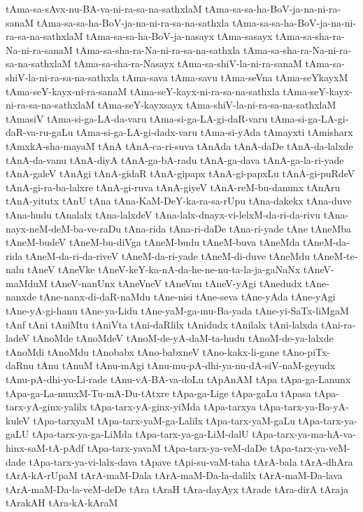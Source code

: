 {tAma-sa-sAvx-nu-BA-va-ni-ra-sa-na-sathxlaM
tAma-sa-sa-ha-BoV-ja-na-ni-ra-sanaM
tAma-sa-sa-ha-BoV-ja-na-ni-ra-sa-na-sathxla
tAma-sa-sa-ha-BoV-ja-na-ni-ra-sa-na-sathxlaM
tAma-sa-sa-ha-BoV-ja-nasayx
tAma-sasayx
tAma-sa-sha-ra-Na-ni-ra-sanaM
tAma-sa-sha-ra-Na-ni-ra-sa-na-sathxla
tAma-sa-sha-ra-Na-ni-ra-sa-na-sathxlaM
tAma-sa-sha-ra-Nasayx
tAma-sa-shiV-la-ni-ra-sanaM
tAma-sa-shiV-la-ni-ra-sa-na-sathxla
tAma-sava
tAma-savu
tAma-seVna
tAma-seYkayxM
tAma-seY-kayx-ni-ra-sanaM
tAma-seY-kayx-ni-ra-sa-na-sathxla
tAma-seY-kayx-ni-ra-sa-na-sathxlaM
tAma-seY-kayxsayx
tAma-shiV-la-ni-ra-sa-na-sathxlaM
tAmasiV
tAma-si-ga-LA-da-varu
tAma-si-ga-LA-gi-daR-varu
tAma-si-ga-LA-gi-daR-va-ru-gaLu
tAma-si-ga-LA-gi-dadx-varu
tAma-si-yAda
tAmayxti
tAmisharx
tAmxkA-sha-mayaM
tAnA
tAnA-ca-ri-suva
tAnAda
tAnA-daDe
tAnA-da-lalxde
tAnA-da-vanu
tAnA-diyA
tAnA-ga-bA-radu
tAnA-ga-dava
tAnA-ga-la-ri-yade
tAnA-galeV
tAnAgi
tAnA-gidaR
tAnA-gipapx
tAnA-gi-papxLu
tAnA-gi-puRdeV
tAnA-gi-ra-ba-lalxre
tAnA-gi-ruva
tAnA-giyeV
tAnA-reM-bu-danunx
tAnAru
tAnA-yitutx
tAnU
tAna
tAna-KaM-DeY-ka-ra-sa-rUpu
tAna-dakekx
tAna-duve
tAna-hudu
tAnalalx
tAna-lalxdeV
tAna-lalx-dnayx-vi-lelxM-da-ri-da-rivu
tAna-nayx-neM-deM-ba-ve-raDu
tAna-rida
tAna-ri-daDe
tAna-ri-yade
tAne
tAneMba
tAneM-budeV
tAneM-bu-diVga
tAneM-budu
tAneM-buva
tAneMda
tAneM-da-rida
tAneM-da-ri-da-riveV
tAneM-da-ri-yade
tAneM-di-duve
tAneMdu
tAneM-te-nalu
tAneV
tAneVke
tAneV-keY-ka-nA-da-he-ne-nu-ta-la-ja-gaNaNx
tAneV-maMduM
tAneV-nanUnx
tAneVneV
tAneVnu
tAneV-yAgi
tAnedudx
tAne-nanxde
tAne-nanx-di-daR-naMdu
tAne-nisi
tAne-seva
tAne-yAda
tAne-yAgi
tAne-yA-gi-hanu
tAne-ya-Lidu
tAne-yaM-ga-mu-Ba-yada
tAne-yi-SaTx-liMgaM
tAnf
tAni
tAniMtu
tAniVta
tAni-daRlilx
tAnidudx
tAnilalx
tAni-lalxda
tAni-ra-ladeV
tAnoMde
tAnoMdeV
tAnoM-de-yA-daM-ta-hudu
tAnoM-de-ya-lalxde
tAnoMdi
tAnoMdu
tAnobabx
tAno-babxneV
tAno-kakx-li-gane
tAno-piTx-daRnu
tAnu
tAnuM
tAnu-mAgi
tAnu-mu-pA-dhi-ya-nu-dA-siV-naM-geyudx
tAnu-pA-dhi-yo-Li-rade
tAnu-vA-BA-va-doLu
tApAnAM
tApa
tApa-ga-Lanunx
tApa-ga-La-nunxM-Tu-mA-Du-tAtxre
tApa-ga-Lige
tApa-gaLu
tApasa
tApa-tarx-yA-ginx-yalilx
tApa-tarx-yA-ginx-yiMda
tApa-tarxya
tApa-tarx-ya-Ba-yA-kuleV
tApa-tarxyaM
tApa-tarx-yaM-ga-Lalilx
tApa-tarx-yaM-gaLu
tApa-tarx-ya-gaLU
tApa-tarx-ya-ga-LiMda
tApa-tarx-ya-ga-LiM-dalU
tApa-tarx-ya-ma-hA-va-hinx-saM-tA-pAdf
tApa-tarx-yavaM
tApa-tarx-ya-veM-daDe
tApa-tarx-ya-veM-dade
tApa-tarx-ya-vi-lalx-dava
tApave
tApi-su-vaM-taha
tArA-bala
tArA-dhAra
tArA-kA-rUpaM
tArA-maM-Dala
tArA-maM-Da-la-dalilx
tArA-maM-Da-lava
tArA-maM-Da-la-veM-deDe
tAra
tAraH
tAra-dayAyx
tArade
tAra-dirA
tAraja
tArakAH
tAra-kA-kAraM
}
